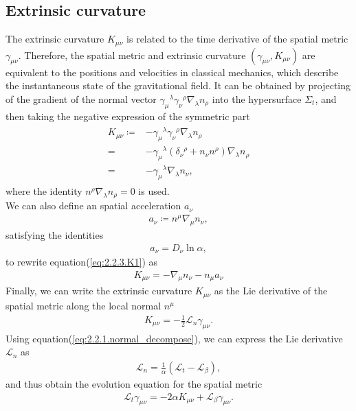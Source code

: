 \subsection{Extrinsic curvature} \label{section2.2.3}
The extrinsic curvature $K_{\mu\nu}$ is related to the time derivative of the spatial metric $\gamma_{\mu\nu}$.
Therefore, the spatial metric and extrinsic curvature $\left(\gamma_{\mu\nu}, K_{\mu\nu} \right)$ are equivalent to the positions and velocities in classical mechanics,
which describe the instantaneous state of the gravitational field.
It can be obtained by projecting of the gradient of the normal vector $\gamma_{\mu}{}^{\lambda}\gamma_{\nu}{}^{\rho} \nabla_{\lambda} n_{\rho}$ into the hypersurface $\Sigma_t$,
and then taking the negative expression of the symmetric part
\begin{align}\label{eq:2.2.3.K1}
\begin{split}
   K_{\mu\nu} \coloneqq& - \gamma_{\mu}{}^{\lambda}\gamma_{\nu}{}^{\rho} \nabla_{\lambda} n_{\rho} \\
   =& - \gamma_{\mu}{}^{\lambda} \left( \delta_{\nu}{}^{\rho} + n_{\nu} n^{\rho} \right) \nabla_{\lambda} n_{\rho} \\
   =& - \gamma_{\mu}{}^{\lambda} \nabla_{\lambda} n_{\nu},
\end{split}
\end{align}
where the identity $n^{\rho}\nabla_{\lambda} n_{\rho}=0$ is used. \\
We can also define an spatial acceleration $a_\nu$
\begin{align}
    a_\nu \coloneqq n^\mu \nabla_\mu n_\nu,
\end{align}
satisfying the identities
\begin{align}
    a_\nu = D_\nu \ln{\alpha},
\end{align}
to rewrite equation(\ref{eq:2.2.3.K1}) as
\begin{align}
    K_{\mu\nu} = - \nabla_\mu n_\nu - n_\mu a_\nu
\end{align}
Finally, we can write the extrinsic curvature $K_{\mu\nu}$ as the Lie derivative of the spatial metric along the local normal $n^\mu$
\begin{align}
    K_{\mu\nu} = - \frac{1}{2} \mathcal{L}_{n} \gamma_{\mu\nu}.
\end{align}
Using equation(\ref{eq:2.2.1.normal_decompose}), we can express the Lie derivative $\mathcal{L}_n$ as
\begin{align}\label{eq:normal_Lie}
    \mathcal{L}_n = \frac{1}{\alpha} \left( \mathcal{L}_t - \mathcal{L}_\beta \right),
\end{align}
and thus obtain the evolution equation for the spatial metric
\begin{align}\label{eq:g_evol}
    \mathcal{L}_t \gamma_{\mu\nu} = - 2\alpha K_{\mu\nu} + \mathcal{L}_\beta \gamma_{\mu\nu}.
\end{align}


